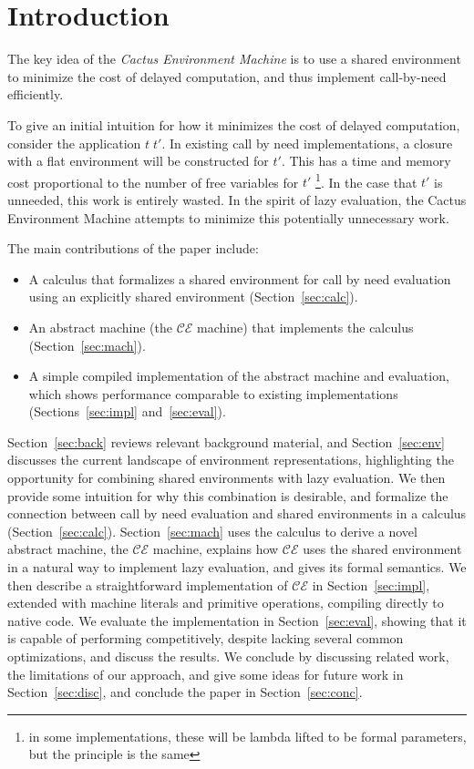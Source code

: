 \section{Introduction}

The key idea of the \emph{Cactus Environment Machine} is to use a shared
environment to minimize the cost of delayed computation, and thus implement
call-by-need efficiently.

To give an initial intuition for how it minimizes the cost of delayed
computation, consider the application $t \; t'$. In existing call by need
implementations, a closure with a flat environment will be constructed for $t'$.
This has a time and memory cost proportional to the number of free variables for
$t'$ \footnote{in some implementations, these will be lambda lifted to be formal
parameters, but the principle is the same}. In the case that $t'$ is unneeded,
this work is entirely wasted. In the spirit of lazy evaluation, the Cactus
Environment Machine attempts to minimize this potentially unnecessary work.  

The main contributions of the paper include:
\begin{itemize}
\item A calculus that formalizes a shared environment for call by need
evaluation using an explicitly shared environment (Section~\ref{sec:calc}).
\item An abstract machine (the $\mathcal{CE}$ machine) that implements the
calculus (Section~\ref{sec:mach}). 
\item A simple compiled implementation of the abstract machine and evaluation,
which shows performance comparable to existing implementations
(Sections~\ref{sec:impl} and~\ref{sec:eval}).
\end{itemize}

Section~\ref{sec:back} reviews relevant background material, and
Section~\ref{sec:env} discusses the current landscape of environment
representations, highlighting the opportunity for combining shared environments
with lazy evaluation.  We then provide some intuition for why this combination
is desirable, and formalize the connection between call by need evaluation and
shared environments in a calculus (Section~\ref{sec:calc}).
Section~\ref{sec:mach} uses the calculus to derive a novel abstract machine, the
$\mathcal{CE}$ machine, explains how $\mathcal{CE}$ uses the shared environment
in a natural way to implement lazy evaluation, and gives its formal semantics.
We then describe a straightforward implementation of $\mathcal{CE}$ in
Section~\ref{sec:impl}, extended with machine literals and primitive operations,
compiling directly to native code. We evaluate the implementation in
Section~\ref{sec:eval}, showing that it is capable of performing competitively,
despite lacking several common optimizations, and discuss the results. We
conclude by discussing related work, the limitations of our approach, and give
some ideas for future work in Section~\ref{sec:disc}, and conclude the paper in
Section~\ref{sec:conc}.


